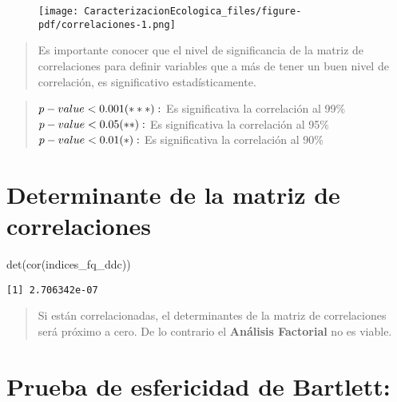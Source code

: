 \documentclass[
  10pt,
  letterpaper,
  DIV=11,
  numbers=noendperiod]{scrreprt}
\newenvironment{Shaded}{\begin{snugshade}}{\end{snugshade}}
\newcommand{\FunctionTok}[1]{\textcolor[rgb]{0.28,0.35,0.67}{#1}}
\newcommand{\NormalTok}[1]{\textcolor[rgb]{0.00,0.23,0.31}{#1}}
\begin{document}
\begin{figure}[tb]

{\centering \texttt{[image: CaracterizacionEcologica\_files/figure-pdf/correlaciones-1.png]}

}

\end{figure}

\begin{quote}
Es importante conocer que el nivel de significancia de la matriz de
correlaciones para definir variables que a más de tener un buen nivel de
correlación, es significativo estadísticamente.
\end{quote}

\begin{quote}
\(\\p-value < 0.001 (***):\) Es significativa la correlación al 99\%
\(\\p-value < 0.05 (**):\) Es significativa la correlación al 95\%
\(\\p-value < 0.01 (*):\) Es significativa la correlación al 90\%
\end{quote}

\hypertarget{determinante-de-la-matriz-de-correlaciones}{%
\section{Determinante de la matriz de
correlaciones}\label{determinante-de-la-matriz-de-correlaciones}}

\begin{Shaded}
\begin{Highlighting}[numbers=left,,]
\FunctionTok{det}\NormalTok{(}\FunctionTok{cor}\NormalTok{(indices\_fq\_ddc))}
\end{Highlighting}
\end{Shaded}

\begin{verbatim}
[1] 2.706342e-07
\end{verbatim}

\begin{quote}
Si están correlacionadas, el determinantes de la matriz de correlaciones
será próximo a cero. De lo contrario el \textbf{Análisis Factorial} no
es viable.
\end{quote}

\hypertarget{prueba-de-esfericidad-de-bartlett}{%
\section{Prueba de esfericidad de
Bartlett:}\label{prueba-de-esfericidad-de-bartlett}}
\end{document}
